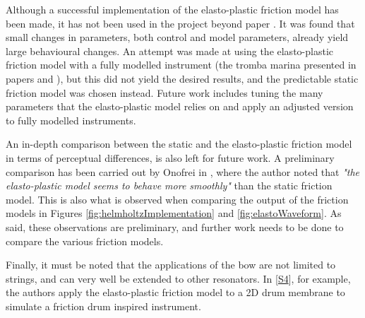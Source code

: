 Although a successful implementation of the elasto-plastic friction model has been made, it has not been used in the project beyond paper \citeP[C]. It was found that small changes in parameters, both control and model parameters, already yield large behavioural changes. An attempt was made at using the elasto-plastic friction model with a fully modelled instrument (the tromba marina presented in papers \citeP[D] and \citeP[E]), but this did not yield the desired results, and the predictable static friction model was chosen instead. Future work includes tuning the many parameters that the elasto-plastic model relies on and apply an adjusted version to fully modelled instruments.

An in-depth comparison between the static and the elasto-plastic friction model in terms of perceptual differences, is also left for future work. A preliminary comparison has been carried out by Onofrei in \cite{Onofrei2021}, where the author noted that \textit{"the
elasto-plastic model seems to behave more smoothly"} than the static friction model. This is also what is observed when comparing the output of the friction models in Figures \ref{fig:helmholtzImplementation} and \ref{fig:elastoWaveform}. As said, these observations are preliminary, and further work needs to be done to compare the various friction models.

Finally, it must be noted that the applications of the bow are not limited to strings, and can very well be extended to other resonators. In [\hyperref[ch:listOfPublications]{S4}], for example, the authors apply the elasto-plastic friction model to a 2D drum membrane to simulate a friction drum inspired instrument.